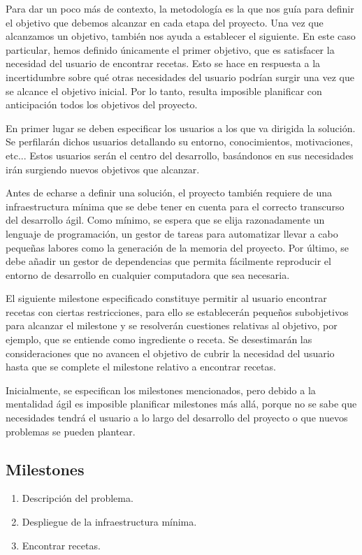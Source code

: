 Para dar un poco más de contexto, la metodología es la que nos guía para definir el objetivo que debemos alcanzar en cada etapa del proyecto. Una vez que alcanzamos un objetivo, también nos ayuda a establecer el siguiente. En este caso particular, hemos definido únicamente el primer objetivo, que es satisfacer la necesidad del usuario de encontrar recetas. Esto se hace en respuesta a la incertidumbre sobre qué otras necesidades del usuario podrían surgir una vez que se alcance el objetivo inicial. Por lo tanto, resulta imposible planificar con anticipación todos los objetivos del proyecto.

En primer lugar se deben especificar los usuarios a los que va dirigida la solución. Se perfilarán dichos usuarios detallando su entorno, conocimientos, motivaciones, etc... Estos usuarios serán el centro del desarrollo, basándonos en sus necesidades irán surgiendo nuevos objetivos que alcanzar. 

Antes de echarse a definir una solución, el proyecto también requiere de una infraestructura mínima que se debe tener en cuenta para el correcto transcurso del desarrollo ágil. Como mínimo, se espera que se elija razonadamente un lenguaje de programación, un gestor de tareas para automatizar llevar a cabo pequeñas labores como la generación de la memoria del proyecto. Por último, se debe añadir un gestor de dependencias que permita fácilmente reproducir el entorno de desarrollo en cualquier computadora que sea necesaria.

El siguiente milestone especificado constituye permitir al usuario encontrar recetas con ciertas restricciones, para ello se establecerán pequeños subobjetivos para alcanzar el milestone y se resolverán cuestiones relativas al objetivo, por ejemplo, que se entiende como ingrediente o receta. Se desestimarán las consideraciones que no avancen el objetivo de cubrir la necesidad del usuario hasta que se complete el milestone relativo a encontrar recetas.

Inicialmente, se especifican los milestones mencionados, pero debido a la mentalidad ágil es imposible planificar milestones más allá, porque no se sabe que necesidades tendrá el usuario a lo largo del desarrollo del proyecto o que nuevos problemas se pueden plantear.

\subsection{Milestones}
\begin{enumerate}
    \item Descripción del problema.
    \item Despliegue de la infraestructura mínima.
    \item Encontrar recetas.
\end{enumerate}